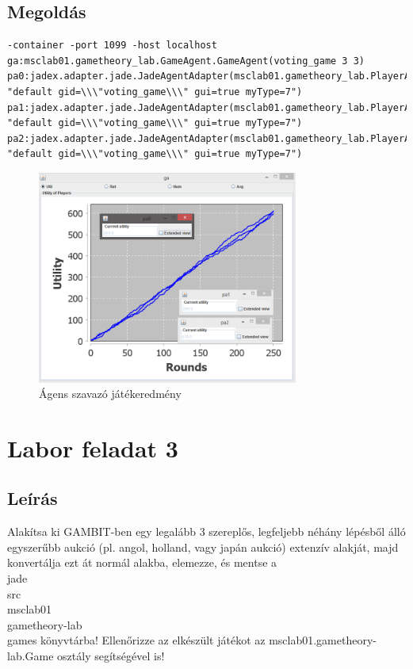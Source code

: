 \subsection{Megoldás}
\begin{lstlisting}[caption=Szavazás run config, frame=single,float=!ht]
-container -port 1099 -host localhost 
ga:msclab01.gametheory_lab.GameAgent.GameAgent(voting_game 3 3) pa0:jadex.adapter.jade.JadeAgentAdapter(msclab01.gametheory_lab.PlayerAgent.Player 
"default gid=\\\"voting_game\\\" gui=true myType=7") 
pa1:jadex.adapter.jade.JadeAgentAdapter(msclab01.gametheory_lab.PlayerAgent.Player 
"default gid=\\\"voting_game\\\" gui=true myType=7")
pa2:jadex.adapter.jade.JadeAgentAdapter(msclab01.gametheory_lab.PlayerAgent.Player 
"default gid=\\\"voting_game\\\" gui=true myType=7")
\end{lstlisting}
\begin{figure}[h]
\begin{center}
\includegraphics[height=7cm]{figures/voting_jadex.png}
\caption{Ágens szavazó játékeredmény}
\end{center}
\end{figure}

\section{Labor feladat 3}
\subsection{Leírás}
Alakítsa ki GAMBIT-ben egy legalább 3 szereplős, legfeljebb néhány lépésből álló egyszerűbb aukció (pl. angol, holland, vagy japán aukció) extenzív alakját, majd konvertálja ezt át normál alakba, elemezze, és mentse a \\jade\\src\\msclab01\\gametheory-lab\\games könyvtárba! Ellenőrizze az elkészült játékot az msclab01.gametheory-lab.Game osztály segítségével is! 
